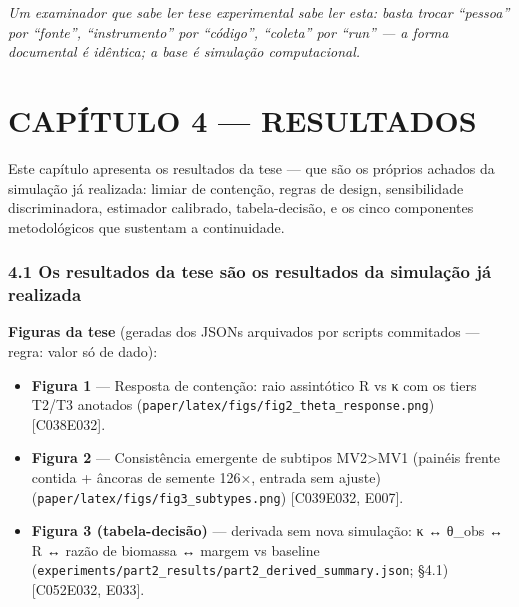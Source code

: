 \documentclass[
  10pt,
]{article}
\providecommand{\tightlist}{%
  \setlength{\itemsep}{0pt}\setlength{\parskip}{0pt}}
\begin{document}
\emph{Um examinador que sabe ler tese experimental sabe ler esta: basta
trocar ``pessoa'' por ``fonte'', ``instrumento'' por ``código'',
``coleta'' por ``run'' --- a forma documental é idêntica; a base é
simulação computacional.}

\hypertarget{capuxedtulo-4-resultados}{%
\section{CAPÍTULO 4 --- RESULTADOS}\label{capuxedtulo-4-resultados}}

Este capítulo apresenta os resultados da tese --- que são os próprios
achados da simulação já realizada: limiar de contenção, regras de
design, sensibilidade discriminadora, estimador calibrado,
tabela-decisão, e os cinco componentes metodológicos que sustentam a
continuidade.

\hypertarget{os-resultados-da-tese-suxe3o-os-resultados-da-simulauxe7uxe3o-juxe1-realizada}{%
\subsubsection{4.1 Os resultados da tese são os resultados da simulação
já
realizada}\label{os-resultados-da-tese-suxe3o-os-resultados-da-simulauxe7uxe3o-juxe1-realizada}}

\textbf{Figuras da tese} (geradas dos JSONs arquivados por scripts
commitados --- regra: valor só de dado):

\begin{itemize}
\tightlist
\item
  \textbf{Figura 1} --- Resposta de contenção: raio assintótico R vs κ
  com os tiers T2/T3 anotados
  (\texttt{paper/latex/figs/fig2\_theta\_response.png})
  {[}C038\textbar E032{]}.
\item
  \textbf{Figura 2} --- Consistência emergente de subtipos
  MV2\textgreater MV1 (painéis frente contida + âncoras de semente 126×,
  entrada sem ajuste) (\texttt{paper/latex/figs/fig3\_subtypes.png})
  {[}C039\textbar E032, E007{]}.
\item
  \textbf{Figura 3 (tabela-decisão)} --- derivada sem nova simulação: κ
  ↔ θ\_obs ↔ R ↔ razão de biomassa ↔ margem vs baseline
  (\texttt{experiments/part2\_results/part2\_derived\_summary.json};
  §4.1) {[}C052\textbar E032, E033{]}.
\end{itemize}
\end{document}
